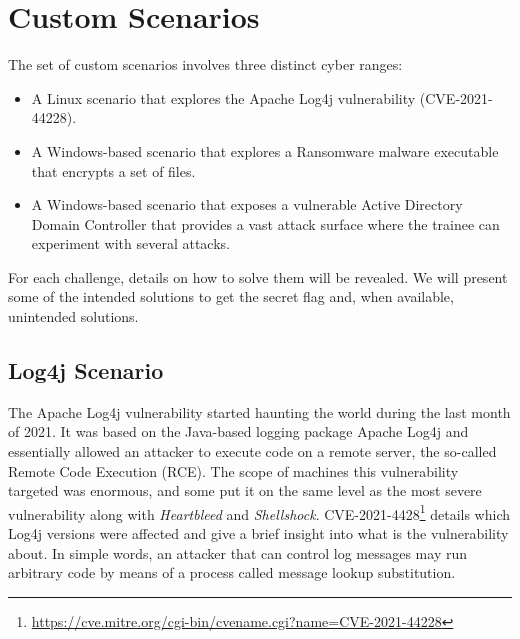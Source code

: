 \section{Custom Scenarios} \label{sec:validation_custom_scenarios}

The set of custom scenarios involves three distinct cyber ranges:

\begin{itemize}
    \item A Linux scenario that explores the Apache Log4j vulnerability (CVE-2021-44228).
    \item A Windows-based scenario that explores a Ransomware malware executable that encrypts a set of files.
    \item A Windows-based scenario that exposes a vulnerable Active Directory Domain Controller that provides a vast attack surface where the trainee can experiment with several attacks. 
\end{itemize}

For each challenge, details on how to solve them will be revealed. We will present some of the intended solutions to get the secret flag and, when available, unintended solutions.

\subsection{Log4j Scenario} \label{sec:validation_log4j_scenario}

The Apache Log4j vulnerability started haunting the world during the last month of 2021. It was based on the Java-based logging package Apache Log4j and essentially allowed an attacker to execute code on a remote server, the so-called Remote Code Execution (RCE). The scope of machines this vulnerability targeted was enormous, and some put it on the same level as the most severe vulnerability along with \textit{Heartbleed} and \textit{Shellshock}. CVE-2021-4428\footnote{\url{https://cve.mitre.org/cgi-bin/cvename.cgi?name=CVE-2021-44228}} details which Log4j versions were affected and give a brief insight into what is the vulnerability about. In simple words, an attacker that can control log messages may run arbitrary code by means of a process called message lookup substitution.

